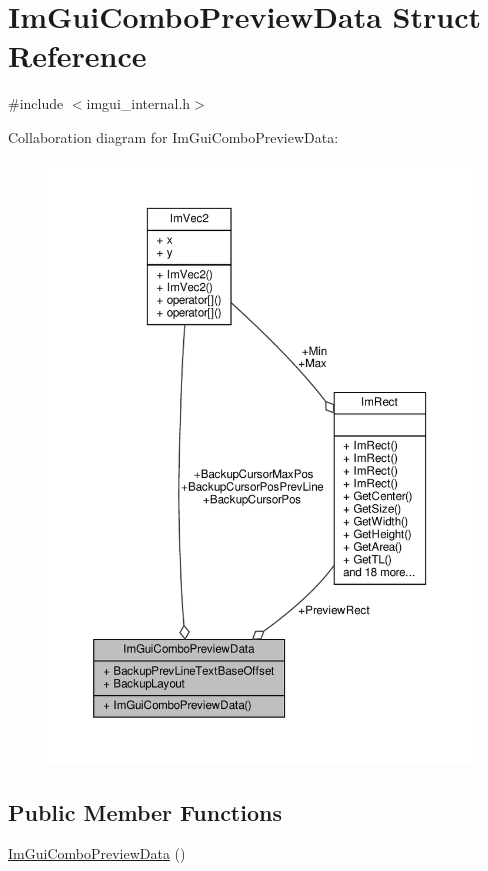 \hypertarget{structImGuiComboPreviewData}{}\section{Im\+Gui\+Combo\+Preview\+Data Struct Reference}
\label{structImGuiComboPreviewData}


{\ttfamily \#include $<$imgui\+\_\+internal.\+h$>$}



Collaboration diagram for Im\+Gui\+Combo\+Preview\+Data\+:
\nopagebreak
\begin{figure}[H]
\begin{center}
\leavevmode
\includegraphics[width=350pt]{structImGuiComboPreviewData__coll__graph}
\end{center}
\end{figure}
\subsection*{Public Member Functions}
\begin{DoxyCompactItemize}
\item 
\hyperlink{structImGuiComboPreviewData_a52eb1c065997a765a30d18ad369e7c2c}{Im\+Gui\+Combo\+Preview\+Data} ()
\end{DoxyCompactItemize}
